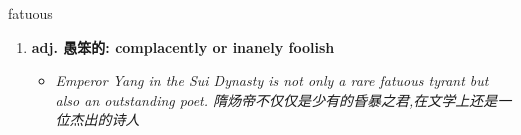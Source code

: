 
\begin{frame}
{\huge fatuous}
\begin{center}
\begin{enumerate}\Large
  \item \textbf{adj. 愚笨的: complacently or inanely foolish}
  \begin{itemize}
    \item \em{\Large{Emperor Yang in the Sui Dynasty is not only a rare fatuous tyrant but also an outstanding poet. 隋炀帝不仅仅是少有的昏暴之君,在文学上还是一位杰出的诗人}}
  \end{itemize}
\end{enumerate}
\end{center}
\end{frame}
